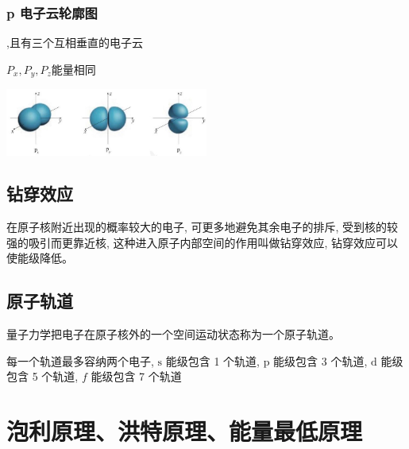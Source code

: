 \documentclass[10pt,cn]{elegantbook}
\begin{document}
	 \subsection{p 电子云轮廓图} 
	 
	 ,且有三个互相垂直的电子云
	 
	 $P_{x},P_{y},P_{z}$能量相同
	 
	 	\begin{center}
	 	\includegraphics[max width=0.5\textwidth]{image/c51-3.jpg}
	 \end{center}
	 
	 \section{钻穿效应} 
	 
	 在原子核附近出现的概率较大的电子, 可更多地避免其余电子的排斥, 受到核的较强的吸引而更靠近核, 这种进入原子内部空间的作用叫做钻穿效应, 钻穿效应可以使能级降低。
	 
	 \section{原子轨道}
	 
	 量子力学把电子在原子核外的一个空间运动状态称为一个原子轨道。
	 
	 每一个轨道最多容纳两个电子, \(\mathrm{s}\) 能级包含 1 个轨道, \(\mathrm{p}\) 能级包含 3 个轨道, \(\mathrm{d}\) 能级包含 5 个轨道, \(f\) 能级包含 7 个轨道
	 
	 \begin{center}
	 \end{center}
	 
	 \chapter{泡利原理、洪特原理、能量最低原理}
	 
\end{document}

